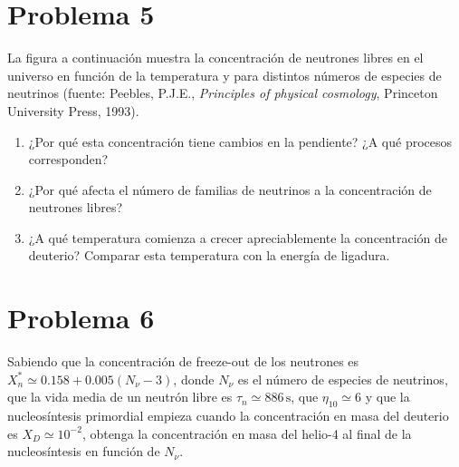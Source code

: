 \documentclass[11pt,a4paper]{article}
\begin{document}
\section*{Problema 5}
La figura a continuación muestra la concentración de neutrones libres en el universo en función de la temperatura y para distintos números de especies de neutrinos (fuente: Peebles, P.J.E., \emph{Principles of physical cosmology}, Princeton University Press, 1993).
\begin{enumerate}
  \item[(a)] ¿Por qué esta concentración tiene cambios en la pendiente? ¿A qué procesos corresponden?
  \item[(b)] ¿Por qué afecta el número de familias de neutrinos a la concentración de neutrones libres?
  \item[(c)] ¿A qué temperatura comienza a crecer apreciablemente la concentración de deuterio? Comparar esta temperatura con la energía de ligadura.
\end{enumerate}

\section*{Problema 6}
Sabiendo que la concentración de freeze-out de los neutrones es $X_n^*\simeq 0.158+0.005(N_\nu-3)$, donde $N_\nu$ es el número de especies de neutrinos, que la vida media de un neutrón libre es $\tau_n\simeq 886\,\text{s}$, que $\eta_{10}\simeq6$ y que la nucleosíntesis primordial empieza cuando la concentración en masa del deuterio es $X_D\simeq10^{-2}$, obtenga la concentración en masa del helio-4 al final de la nucleosíntesis en función de $N_\nu$.
\end{document}
